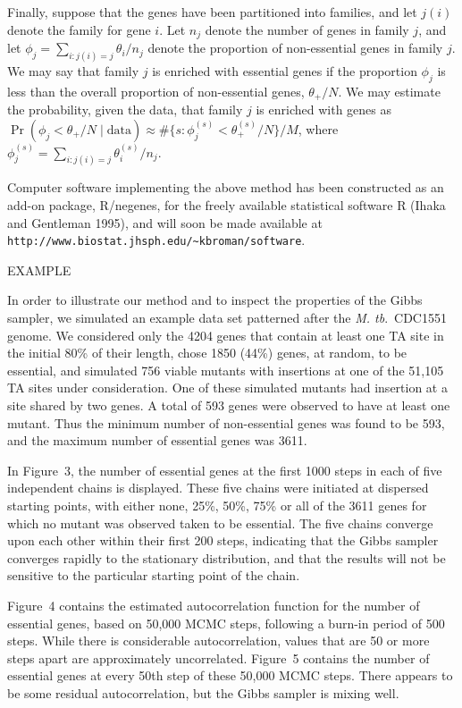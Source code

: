 \documentclass[letterpaper]{article}
\begin{document}
\begin{multicols}{2}
Finally, suppose that the genes have been partitioned into families,
and let $j(i)$ denote the family for gene $i$.  Let $n_j$ denote the
number of genes in family $j$, and let $\phi_j = \sum_{i:j(i)=j}
\theta_i / n_j$ denote the proportion of non-essential genes in family
$j$.  We may say that family $j$ is enriched with essential genes if
the proportion $\phi_j$ is less than the overall proportion of
non-essential genes, $\theta_+ / N$.  We may estimate the probability,
given the data, that family $j$ is enriched with genes as $\Pr(\phi_j
< \theta_+ / N \; | \; \text{data}) \approx \# \{s: \phi_j^{(s)} <
\theta_+^{(s)} / N\} / M$, where $\phi_j^{(s)} = \sum_{i:j(i)=j}
\theta^{(s)}_i / n_j$.

Computer software implementing the above method has been constructed
as an add-on package, R/negenes, for the freely available statistical
software R (Ihaka and Gentleman 1995), and will soon be made available
at {\footnotesize \verb|http://www.biostat.jhsph.edu/~kbroman/software|}.


\smallskip \bigskip
\centerline{EXAMPLE}
\smallskip

In order to illustrate our method and to inspect the properties of the
Gibbs sampler, we simulated an example data set patterned after the
\emph{M. tb}.\ CDC1551 genome.  We considered only the 4204 genes that
contain at least one TA site in the initial 80\% of their length,
chose 1850 (44\%) genes, at random, to be essential, and simulated 756
viable mutants with insertions at one of the 51,105 TA sites under
consideration.  One of these simulated mutants had insertion at a site
shared by two genes.  A total of 593 genes were observed to have at
least one mutant. Thus the minimum number of non-essential genes was
found to be 593, and the maximum number of essential genes was 3611.

In Figure~3, the number of essential genes at the first 1000
steps in each of five independent chains is displayed.  These five
chains were initiated at dispersed starting points, with either none,
25\%, 50\%, 75\% or all of the 3611 genes for which no mutant was
observed taken to be essential.  The five chains converge upon each
other within their first 200 steps, indicating that the Gibbs
sampler converges rapidly to the stationary distribution, and that the
results will not be sensitive to the particular starting point of the
chain.  

Figure~4 contains the estimated autocorrelation function for the
number of essential genes, based on 50,000 MCMC steps, following a
burn-in period of 500 steps.  While there is considerable
autocorrelation, values that are 50 or more steps apart are
approximately uncorrelated.  Figure~5 contains the number of essential
genes at every 50th step of these 50,000 MCMC steps.  There appears to
be some residual autocorrelation, but the Gibbs sampler is
mixing well.



\end{multicols}
\end{document}

